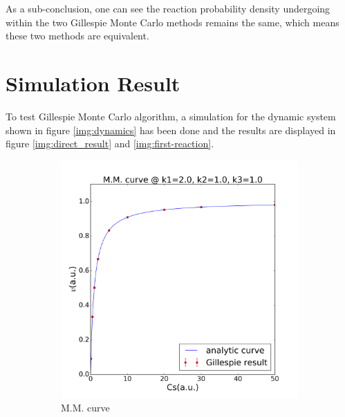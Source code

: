 		As a sub-conclusion, one can see the reaction probability density undergoing within the two Gillespie Monte Carlo methods remains the same, which means these two methods are equivalent.
\section{Simulation Result}
	To test Gillespie Monte Carlo algorithm, a simulation for the dynamic system shown in figure \ref{img:dynamics} has been done and the results are displayed in figure \ref{img:direct_result} and \ref{img:first-reaction}.
	\begin{figure}[H]
		\centering
		\begin{subfigure}{0.46\textwidth}
		\includegraphics[scale=0.33]{img/MM1.png}
		\caption{M.M. curve}
		\end{subfigure}
		\begin{subfigure}{0.46\textwidth}

\end{subfigure}
\end{figure}
